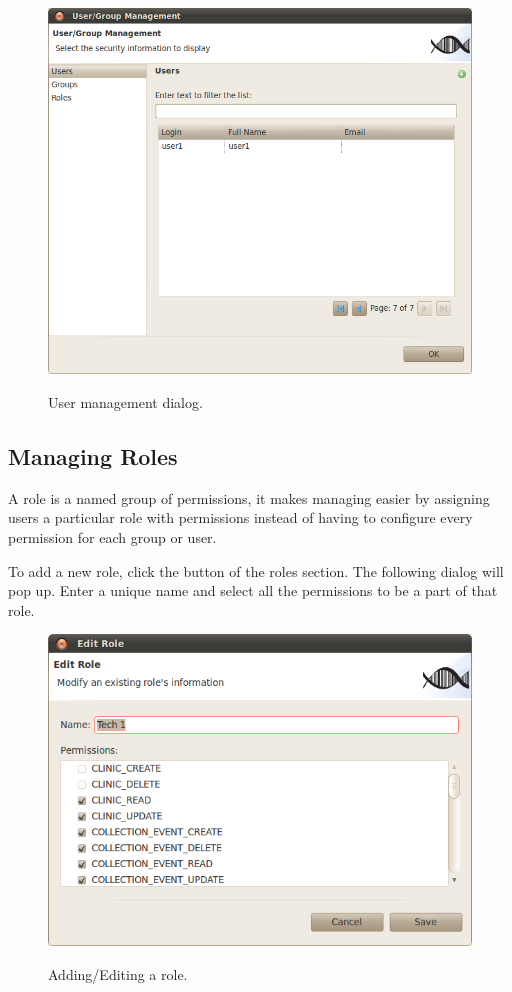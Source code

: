 \begin{figure}[H]
  \centering
  \scalebox{0.5}
	   { \includegraphics*{screenshots/administration/user_management_users} }
	   \caption{User management dialog.}
	   \label{fig:user_management}
\end{figure}

\newpage
\subsection{Managing Roles}
A role is a named group of permissions, it makes managing easier by assigning users a
particular role with permissions instead of having to configure every permission for each
group or user.

To add a new role, click the \fbox{+} button of the roles section. The following dialog will
pop up. Enter a unique name and select all the permissions to be a part of that role.
\begin{figure}[H]
  \centering
  \scalebox{0.5}
	   { \includegraphics*{screenshots/administration/edit_role} }
	   \caption{Adding/Editing a role.}
	   \label{fig:add_group}
\end{figure}

